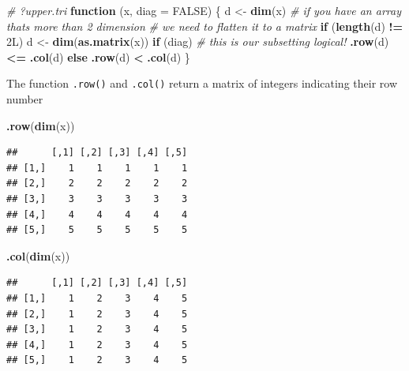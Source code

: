 \documentclass[]{book}
\newenvironment{Shaded}{\begin{snugshade}}{\end{snugshade}}
\newcommand{\CommentTok}[1]{\textcolor[rgb]{0.56,0.35,0.01}{\textit{#1}}}
\newcommand{\ControlFlowTok}[1]{\textcolor[rgb]{0.13,0.29,0.53}{\textbf{#1}}}
\newcommand{\DataTypeTok}[1]{\textcolor[rgb]{0.13,0.29,0.53}{#1}}
\newcommand{\KeywordTok}[1]{\textcolor[rgb]{0.13,0.29,0.53}{\textbf{#1}}}
\newcommand{\NormalTok}[1]{#1}
\newcommand{\OperatorTok}[1]{\textcolor[rgb]{0.81,0.36,0.00}{\textbf{#1}}}
\newcommand{\OtherTok}[1]{\textcolor[rgb]{0.56,0.35,0.01}{#1}}
\newcommand{\StringTok}[1]{\textcolor[rgb]{0.31,0.60,0.02}{#1}}
\begin{document}
\begin{Shaded}
\begin{Highlighting}[]
\CommentTok{# ?upper.tri}
\ControlFlowTok{function}\NormalTok{ (x, }\DataTypeTok{diag =} \OtherTok{FALSE}\NormalTok{) }
\NormalTok{\{}
\NormalTok{    d <-}\StringTok{ }\KeywordTok{dim}\NormalTok{(x)}
    \CommentTok{# if you have an array thats more than 2 dimension}
    \CommentTok{# we need to flatten it to a matrix}
    \ControlFlowTok{if}\NormalTok{ (}\KeywordTok{length}\NormalTok{(d) }\OperatorTok{!=}\StringTok{ }\NormalTok{2L) }
\NormalTok{        d <-}\StringTok{ }\KeywordTok{dim}\NormalTok{(}\KeywordTok{as.matrix}\NormalTok{(x))}
    \ControlFlowTok{if}\NormalTok{ (diag) }
      \CommentTok{# this is our subsetting logical!}
         \KeywordTok{.row}\NormalTok{(d) }\OperatorTok{<=}\StringTok{ }\KeywordTok{.col}\NormalTok{(d)}
    \ControlFlowTok{else} \KeywordTok{.row}\NormalTok{(d) }\OperatorTok{<}\StringTok{ }\KeywordTok{.col}\NormalTok{(d)}
\NormalTok{\}}
\end{Highlighting}
\end{Shaded}

The function \texttt{.row()} and \texttt{.col()} return a matrix of integers indicating their row number

\begin{Shaded}
\begin{Highlighting}[]
\KeywordTok{.row}\NormalTok{(}\KeywordTok{dim}\NormalTok{(x))}
\end{Highlighting}
\end{Shaded}

\begin{verbatim}
##      [,1] [,2] [,3] [,4] [,5]
## [1,]    1    1    1    1    1
## [2,]    2    2    2    2    2
## [3,]    3    3    3    3    3
## [4,]    4    4    4    4    4
## [5,]    5    5    5    5    5
\end{verbatim}

\begin{Shaded}
\begin{Highlighting}[]
\KeywordTok{.col}\NormalTok{(}\KeywordTok{dim}\NormalTok{(x))}
\end{Highlighting}
\end{Shaded}

\begin{verbatim}
##      [,1] [,2] [,3] [,4] [,5]
## [1,]    1    2    3    4    5
## [2,]    1    2    3    4    5
## [3,]    1    2    3    4    5
## [4,]    1    2    3    4    5
## [5,]    1    2    3    4    5
\end{verbatim}
\end{document}
